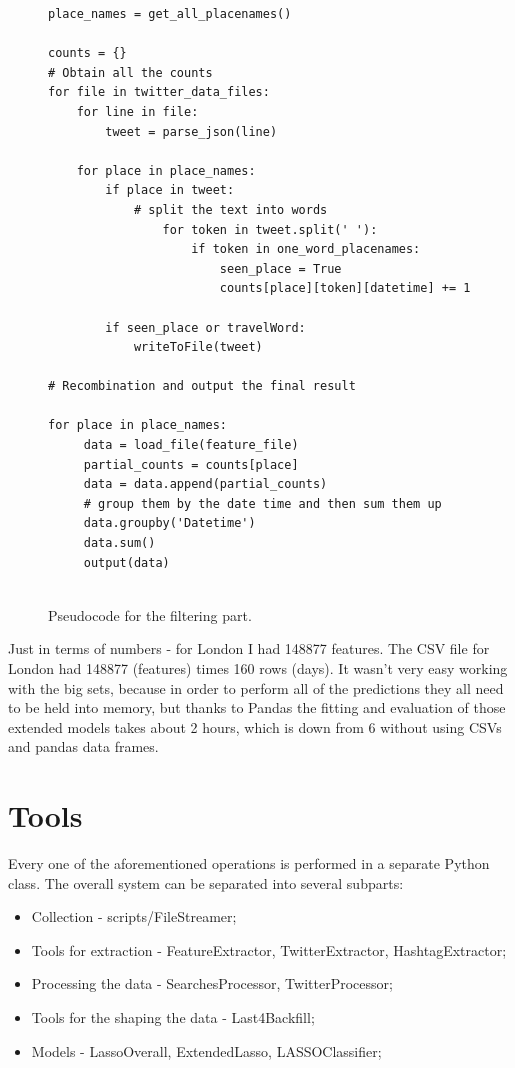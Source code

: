 \documentclass[minf,twoside,singlespacing,parskip,frontabs]{infthesis}
\begin{document}
\begin{figure}[p]
\begin{center}
\begin{lstlisting}
place_names = get_all_placenames()

counts = {}
# Obtain all the counts
for file in twitter_data_files:
    for line in file:
        tweet = parse_json(line)
  
  	for place in place_names:
	    if place in tweet:
	        # split the text into words
                for token in tweet.split(' '): 
                    if token in one_word_placenames:
                        seen_place = True
                        counts[place][token][datetime] += 1

        if seen_place or travelWord:
            writeToFile(tweet)
            
# Recombination and output the final result

for place in place_names:
     data = load_file(feature_file)
     partial_counts = counts[place]
     data = data.append(partial_counts)
     # group them by the date time and then sum them up
     data.groupby('Datetime')
     data.sum()
     output(data)
    
\end{lstlisting}
\end{center}
\caption{Pseudocode for the filtering part. }
\end{figure}


Just in terms of numbers - for London I had 148877 features. The CSV file for London had 148877 (features) times 160 rows (days). It wasn't very easy working with the big sets, because in order to perform all of the predictions they all need to be held into memory, but thanks to Pandas \cite{pandas} the fitting and evaluation of those extended models takes about 2 hours, which is down from 6 without using CSVs and pandas data frames.

\newpage
\section{Tools}


Every one of the aforementioned operations is performed in a separate Python class. The overall system can be separated into several subparts:
\begin{itemize}
\item Collection - scripts/FileStreamer; 
\item Tools for extraction - FeatureExtractor, TwitterExtractor, HashtagExtractor;
\item Processing the data - SearchesProcessor, TwitterProcessor;
\item Tools for the shaping the data - Last4Backfill;
\item Models - LassoOverall, ExtendedLasso, LASSOClassifier;
\end{itemize}
\end{document}

